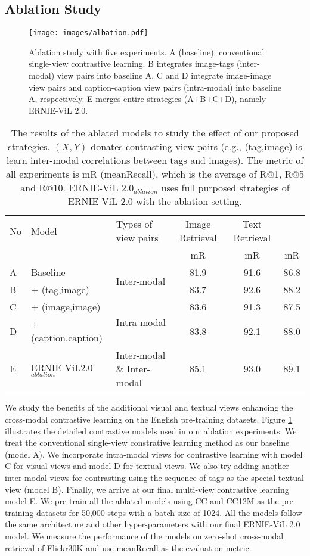 \documentclass{article}
\begin{document}
\subsection{Ablation Study}
\begin{figure*}[]
\centering
\texttt{[image: images/albation.pdf]}
\caption{Ablation study with five experiments. A (baseline): conventional single-view contrastive learning. B integrates image-tags (inter-modal) view pairs into baseline A. C and D integrate image-image view pairs and caption-caption view pairs (intra-modal) into baseline A, respectively. E merges entire strategies (A+B+C+D), namely ERNIE-ViL 2.0. }
\label{ablation_1}
\end{figure*} 
\begin{table*}[]
\centering
\begin{tabular}{lll|c|c|c}
\toprule
No & Model & Types of view pairs & Image Retrieval & Text Retrieval &  \\ 
 &  &  & mR & mR & mR\\ \midrule
A & Baseline & \multirow{2}{*}{Inter-modal} & 81.9 & 91.6& 86.8  \\
B & + (tag,image) &  & 83.7 & 92.6& 88.2 \\ \midrule
C & + (image,image) & \multirow{2}{*}{Intra-modal} & 83.6 & 91.3 & 87.5\\
D & + (caption,caption) &  & 83.8 & 92.1& 88.0\\ \midrule
E & ERNIE-ViL2.0$_{ablation}$ & Inter-modal \& Inter-modal & 85.1 & 93.0 &89.1\\
\bottomrule
\end{tabular}
\caption{ The results of the ablated models to study the effect of our proposed strategies. $(X,Y)$ donates contrasting view pairs (e.g., (tag,image) is learn inter-modal correlations between tags and images). The metric of all experiments is mR (meanRecall), which is the average of R@1, R@5 and R@10.
ERNIE-ViL 2.0$_{ablation}$ uses full purposed strategies of ERNIE-ViL 2.0 with the ablation setting. }
\label{ablation_2}
\end{table*}
\label{sec:alabtion}
We study the benefits of the additional visual and textual views enhancing the cross-modal contrastive learning on the English pre-training datasets. Figure \ref{ablation_1} illustrates the detailed contrastive models used in our ablation experiments. We treat the conventional single-view constrative learning method as our baseline (model A). We incorporate intra-modal views for contrastive learning with model C for visual views and model D for textual views. We also try adding another inter-modal views for contrasting using the sequence of tags as the special textual view (model B). Finally, we arrive at our final multi-view contrastive learning model E. 
We pre-train all the ablated models using CC \cite{ng2020understanding} and CC12M \cite{changpinyo2021cc12m} as the pre-training datasets for 50,000 steps with a batch size of 1024. All the models follow the same architecture and other hyper-parameters with our final ERNIE-ViL 2.0 model. We measure the performance of the models on zero-shot cross-modal retrieval of Flickr30K and use meanRecall as the evaluation metric. 
\end{document}
